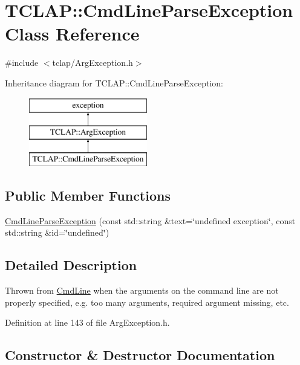 \hypertarget{class_t_c_l_a_p_1_1_cmd_line_parse_exception}{}\section{T\+C\+L\+A\+P\+:\+:Cmd\+Line\+Parse\+Exception Class Reference}
\label{class_t_c_l_a_p_1_1_cmd_line_parse_exception}


{\ttfamily \#include $<$tclap/\+Arg\+Exception.\+h$>$}

Inheritance diagram for T\+C\+L\+A\+P\+:\+:Cmd\+Line\+Parse\+Exception\+:\begin{figure}[H]
\begin{center}
\leavevmode
\includegraphics[height=3.000000cm]{class_t_c_l_a_p_1_1_cmd_line_parse_exception}
\end{center}
\end{figure}
\subsection*{Public Member Functions}
\begin{DoxyCompactItemize}
\item 
\hyperlink{class_t_c_l_a_p_1_1_cmd_line_parse_exception_a3b612ba299dd699845ea108b5eaa3249}{Cmd\+Line\+Parse\+Exception} (const std\+::string \&text=\char`\"{}undefined exception\char`\"{}, const std\+::string \&id=\char`\"{}undefined\char`\"{})
\end{DoxyCompactItemize}


\subsection{Detailed Description}
Thrown from \hyperlink{class_t_c_l_a_p_1_1_cmd_line}{Cmd\+Line} when the arguments on the command line are not properly specified, e.\+g. too many arguments, required argument missing, etc. 

Definition at line 143 of file Arg\+Exception.\+h.



\subsection{Constructor \& Destructor Documentation}
\hypertarget{class_t_c_l_a_p_1_1_cmd_line_parse_exception_a3b612ba299dd699845ea108b5eaa3249}{}
